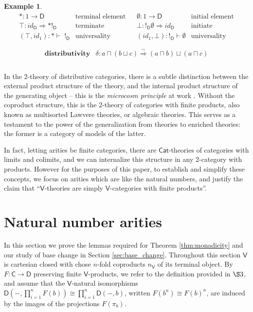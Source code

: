 \documentclass{amsart}
\theoremstyle{definition}
\newtheorem{example}[theorem]{Example}
\newcommand{\Cat}{\mathsf{Cat}}
\newcommand{\V}{\mathsf{V}}
\newcommand{\D}{\mathsf{D}}
\newcommand{\C}{\mathsf{C}}
\newcommand{\maps}{\colon}
\begin{document}
\begin{example}
\[\begin{array}{lllll}
\ast\maps 1 \to \D & \text{terminal element} && \emptyset\maps 1\to \D & \text{initial element}\\
\top\maps id_\D\Longrightarrow \ast !_\D & \text{terminate} && \bot\maps !_\D\emptyset \Longrightarrow id_\D & \text{initiate}\\
(\top,id_1)\maps \ast\vdash\; !_\D &  \text{universality} && (id_1,\bot)\maps !_\D\vdash \emptyset & \text{universality}\\\\
          \end{array}\]
        \[\begin{array}{ll}
            \textbf{distributivity} & \delta\maps a\sqcap(b\sqcup c) \stackrel{\sim}{\Longrightarrow} (a\sqcap b)\sqcup(a\sqcap c)\\
          \end{array}\]\\

        In the 2-theory of distributive categories, there is a subtle distinction between the external product structure of the theory, and the internal product structure of the generating object -- this is the \textit{microcosm principle} at work \cite{}. Without the coproduct structure, this is the 2-theory of categories with finite products, also known as multisorted Lawvere theories, or algebraic theories. This serves as a testament to the power of the generalization from theories to enriched theories: the former is a category of models of the latter.

        In fact, letting arities be finite categories, there are $\Cat$-theories of categories with limits and colimits, and we can internalize this structure in any 2-category with products. However for the purposes of this paper, to establish and simplify these concepts, we focus on arities which are like the natural numbers, and justify the claim that ``$\V$-theories are simply $\V$-categories with finite products''.
        
      \end{example}

\section{Natural number arities}

In this section we prove the lemmas required for Theorem \ref{thm:monadicity} and
our study of base change in Section \ref{sec:base_change}.  Throughout this section $\V$ is cartesian closed with chose $n$-fold coproducts $n_\V$ of its terminal object. By $F\maps \C\to \D$ preserving finite $\V$-products, we refer to the definition provided in $\S 3$, and assume that the $\V$-natural isomorphisms $\D(-,\prod_{i=1}^n F(b))\cong \prod_{i=1}^n \D(-,b)$, written $F(b^n)\cong F(b)^n$, are induced by the images of the projections $F(\pi_{b})$.
\end{document}
